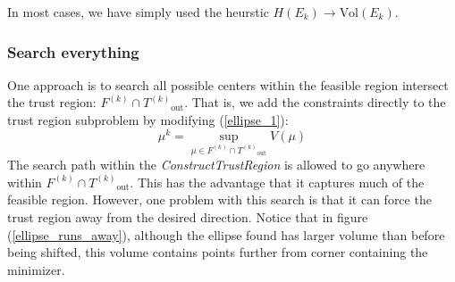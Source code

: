 \documentclass{article}
\theoremstyle{case}
\newcommand{\outertrk}{{T^{(k)}}_{\text{out}}}
\newcommand{\feasiblek}{{F}^{(k)}}
\let\oldref\ref
\renewcommand{\ref}[1]{(\oldref{#1})}
\begin{document}
In most cases, we have simply used the heurstic $H(E_k) \to \text{Vol}(E_k)$.

\subsubsection{Search everything}

One approach is to search all possible centers within the feasible region intersect the trust region:
$ \feasiblek \cap \outertrk$.
That is, we add the constraints directly to the trust region subproblem by modifying \ref{ellipse_1}:
$$\mu^k = \sup_{\mu \in \feasiblek \cap \outertrk} V(\mu)$$
The search path within the \emph{ConstructTrustRegion} is allowed to go anywhere within $ \feasiblek \cap \outertrk$.
This has the advantage that it captures much of the feasible region.
However, one problem with this search is that it can force the trust region away from the desired direction.
Notice that in figure \ref{ellipse_runs_away}, although the ellipse found has larger volume than before being shifted, this volume contains points further from corner containing the minimizer.
\end{document}
